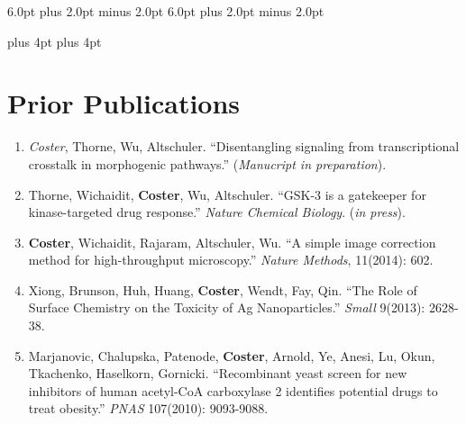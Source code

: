 \documentclass[11pt,oneside]{book}
\begin{document}
\setlength{\textfloatsep}{6.0pt plus 2.0pt minus 4.0pt}
\setlength{\floatsep}    {6.0pt plus 2.0pt minus 2.0pt}
\setlength{\intextsep}   {6.0pt plus 2.0pt minus 2.0pt}
\setlength{\abovecaptionskip}{6pt plus 2pt minus 0pt}

\belowdisplayskip=12pt plus 4pt
\abovedisplayskip=12pt plus 4pt









\fancyhead{}
\fancyfoot{}
\renewcommand{\headrulewidth}{0pt}
\pagestyle{empty}




\pagestyle{plain}
\setcounter{page}{5}



\tableofcontents

\newpage
\vspace*{\fill}
\section*{\Huge Prior Publications}

\begin{enumerate}
\item \textit{Coster}, Thorne, Wu, Altschuler. ``Disentangling signaling from transcriptional crosstalk in morphogenic 
pathways.'' (\textit{Manucript in preparation}).
\item Thorne, Wichaidit, \textbf{Coster}, Wu, Altschuler. ``GSK-3 is a gatekeeper for kinase-targeted drug response.'' \textit{Nature Chemical Biology}. (\textit{in press}).
\item \textbf{Coster}, Wichaidit, Rajaram, Altschuler, Wu. ``A simple image correction method for high-throughput microscopy.'' \textit{Nature Methods}, 11(2014): 602.
\item Xiong, Brunson, Huh, Huang, \textbf{Coster}, Wendt, Fay, Qin. ``The Role of Surface Chemistry on the Toxicity of Ag Nanoparticles.'' \textit{Small} 9(2013): 2628-38.
\item Marjanovic, Chalupska, Patenode, \textbf{Coster}, Arnold, Ye, Anesi, Lu, Okun, Tkachenko, Haselkorn, Gornicki. ``Recombinant yeast screen for new inhibitors of human acetyl-CoA carboxylase 2 identifies potential drugs to treat obesity.'' \textit{PNAS} 107(2010): 9093-9088.
\end{enumerate}
\vspace*{\fill}
\end{document}
